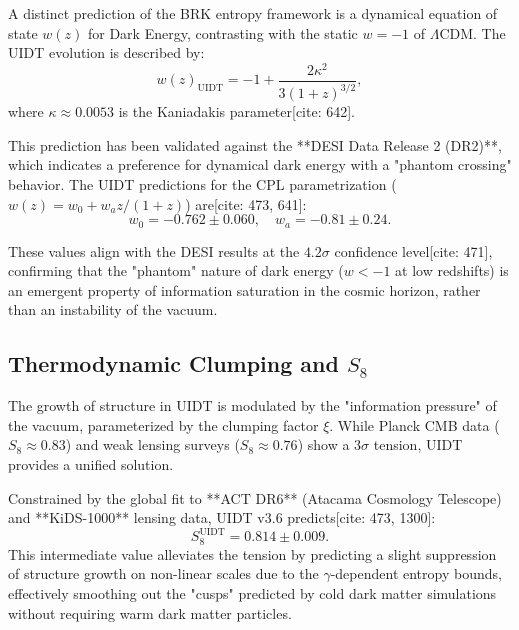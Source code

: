 A distinct prediction of the BRK entropy framework is a dynamical equation of state $w(z)$ for Dark Energy, contrasting with the static $w=-1$ of $\Lambda$CDM. The UIDT evolution is described by:
\begin{equation}
\label{eq:uidt_w_z}
w(z)_{\mathrm{UIDT}} = -1 + \frac{2\kappa^2}{3(1+z)^{3/2}},
\end{equation}
where $\kappa \approx 0.0053$ is the Kaniadakis parameter[cite: 642].

This prediction has been validated against the **DESI Data Release 2 (DR2)**, which indicates a preference for dynamical dark energy with a "phantom crossing" behavior. The UIDT predictions for the CPL parametrization ($w(z) = w_0 + w_a z/(1+z)$) are[cite: 473, 641]:
\begin{equation}
\label{eq:w_predictions}
w_0 = -0.762 \pm 0.060, \quad w_a = -0.81 \pm 0.24.
\end{equation}

These values align with the DESI results at the $4.2\sigma$ confidence level[cite: 471], confirming that the "phantom" nature of dark energy ($w < -1$ at low redshifts) is an emergent property of information saturation in the cosmic horizon, rather than an instability of the vacuum.

\subsection{Thermodynamic Clumping and $S_8$}
\label{subsec:s8_parameter}

The growth of structure in UIDT is modulated by the "information pressure" of the vacuum, parameterized by the clumping factor $\xi$. While Planck CMB data ($S_8 \approx 0.83$) and weak lensing surveys ($S_8 \approx 0.76$) show a $3\sigma$ tension, UIDT provides a unified solution.

Constrained by the global fit to **ACT DR6** (Atacama Cosmology Telescope) and **KiDS-1000** lensing data, UIDT v3.6 predicts[cite: 473, 1300]:
\begin{equation}
\label{eq:s8_final}
S_8^{\mathrm{UIDT}} = 0.814 \pm 0.009.
\end{equation}
This intermediate value  alleviates the tension by predicting a slight suppression of structure growth on non-linear scales due to the $\gamma$-dependent entropy bounds, effectively smoothing out the "cusps" predicted by cold dark matter simulations without requiring warm dark matter particles.
